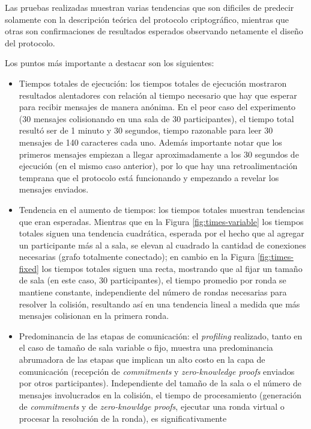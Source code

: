 Las pruebas realizadas muestran varias tendencias que son dificiles de predecir 
solamente con la descripción teórica del protocolo criptográfico, mientras que otras 
son confirmaciones de resultados esperados observando netamente el diseño del 
protocolo.

Los puntos más importante a destacar son los siguientes:

\begin{itemize}
	\item Tiempos totales de ejecución: los tiempos totales de ejecución mostraron 
	resultados alentadores con relación al tiempo necesario que hay que esperar para 
	recibir mensajes de manera anónima. En el peor caso del experimento (30 mensajes 
	colisionando en una sala de 30 participantes), el tiempo total resultó ser de 
	1 minuto y 30 segundos, tiempo razonable para leer 30 mensajes de 140 caracteres 
	cada uno. Además importante notar que los primeros mensajes empiezan a llegar 
	aproximadamente a los 30 segundos de ejecución (en el mismo caso anterior), por lo que 
	hay una retroalimentación temprana que el protocolo está funcionando y empezando a 
	revelar los mensajes enviados.
	\item Tendencia en el aumento de tiempos: los tiempos totales muestran tendencias 
	que eran esperadas. Mientras que en la Figura \ref{fig:times-variable} los tiempos 
	totales siguen una tendencia cuadrática, esperada por el hecho que al agregar 
	un participante más al a sala, se elevan al cuadrado la cantidad de conexiones 
	necesarias (grafo totalmente conectado); en cambio en la Figura \ref{fig:times-fixed} los
	tiempos totales siguen una recta, mostrando que al fijar un tamaño de sala (en este caso, 
	30 participantes), el tiempo promedio por ronda se mantiene constante, independiente 
	del número de rondas necesarias para resolver la colisión, resultando así en una 
	tendencia lineal a medida que más mensajes colisionan en la primera ronda.
	\item Predominancia de las etapas de comunicación: el \emph{profiling} realizado, tanto 
	en el caso de tamaño de sala variable o fijo, muestra una predominancia abrumadora 
	de las etapas que implican un alto costo en la capa de comunicación (recepción de 
	\emph{commitments} y \emph{zero-knowledge proofs} enviados por otros participantes). 
	Independiente del tamaño de la sala o el número de mensajes involucrados en la colisión, 
	el tiempo de procesamiento (generación de \emph{commitments} y de \emph{zero-knowldge proofs}, 
	ejecutar una ronda virtual o procesar la resolución de la ronda), es significativamente 

\end{itemize}
